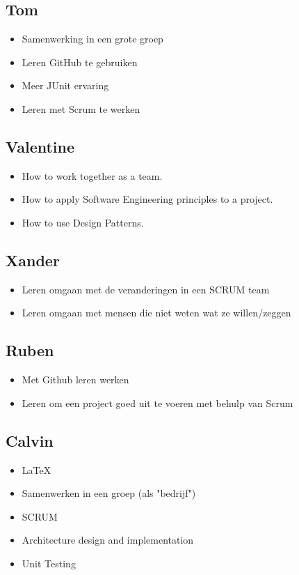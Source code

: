 \documentclass{article}
\begin{document}
\subsection*{Tom}
\begin{itemize}
	\item Samenwerking in een grote groep
	\item Leren GitHub te gebruiken
	\item Meer JUnit ervaring
	\item Leren met Scrum te werken
\end{itemize}
\subsection*{Valentine}
\begin{itemize}
	\item How to work together as a team.
	\item How to apply Software Engineering principles to a project.
	\item How to use Design Patterns.
\end{itemize}

\subsection*{Xander}
\begin{itemize}
	\item Leren omgaan met de veranderingen in een SCRUM team
	\item Leren omgaan met mensen die niet weten wat ze willen/zeggen
\end{itemize}

\subsection*{Ruben}
\begin{itemize}
	\item Met Github leren werken
	\item Leren om een project goed uit te voeren met behulp van Scrum
\end{itemize}
\subsection*{Calvin}
\begin{itemize}
 	\item \LaTeX
	\item Samenwerken in een groep (als "bedrijf")
	\item SCRUM
	\item Architecture design and  implementation
	\item Unit Testing
\end{itemize}
\end{document}
